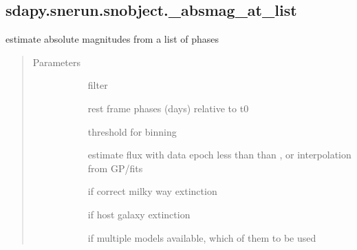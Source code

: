 \documentclass[letterpaper,10pt,english]{sphinxmanual}
\begin{document}
\subsection{sdapy.snerun.snobject.\_absmag\_at\_list}
\label{\detokenize{generated/sdapy.snerun.snobject._absmag_at_list:sdapy-snerun-snobject-absmag-at-list}}\label{\detokenize{generated/sdapy.snerun.snobject._absmag_at_list::doc}}

\begin{fulllineitems}
\label{\detokenize{generated/sdapy.snerun.snobject._absmag_at_list:sdapy.snerun.snobject._absmag_at_list}}
estimate absolute magnitudes from a list of phases
\begin{quote}\begin{description}
\item[{Parameters}] \leavevmode\begin{description}
\item[{}] \leavevmode{[}\sphinxtitleref{str}{]}
filter

\item[{}] \leavevmode{[}\sphinxtitleref{list}{]}
rest frame phases (days) relative to t0

\item[{}] \leavevmode{[}\sphinxtitleref{float}{]}
threshold for binning

\item[{}] \leavevmode{[}\sphinxtitleref{str}{]}
estimate flux with data epoch less than than , or interpolation from GP/fits

\item[{}] \leavevmode{[}\sphinxtitleref{bool}{]}
if correct milky way extinction

\item[{}] \leavevmode{[}\sphinxtitleref{bool}{]}
if host galaxy extinction

\item[{}] \leavevmode{[}\sphinxtitleref{int}{]}
if multiple models available, which of them to be used


\end{description}
\end{description}
\end{quote}
\end{fulllineitems}
\end{document}
